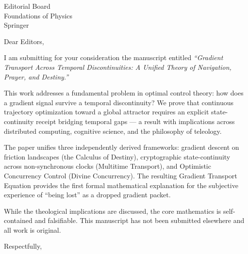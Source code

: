 \documentclass[11pt]{letter}
\begin{document}
\begin{letter}{Editorial Board \\ Foundations of Physics \\ Springer}

\opening{Dear Editors,}

I am submitting for your consideration the manuscript entitled \emph{``Gradient Transport Across Temporal Discontinuities: A Unified Theory of Navigation, Prayer, and Destiny.''}

This work addresses a fundamental problem in optimal control theory: how does a gradient signal survive a temporal discontinuity? We prove that continuous trajectory optimization toward a global attractor requires an explicit state-continuity receipt bridging temporal gaps --- a result with implications across distributed computing, cognitive science, and the philosophy of teleology.

The paper unifies three independently derived frameworks: gradient descent on friction landscapes (the Calculus of Destiny), cryptographic state-continuity across non-synchronous clocks (Multitime Transport), and Optimistic Concurrency Control (Divine Concurrency). The resulting Gradient Transport Equation provides the first formal mathematical explanation for the subjective experience of ``being lost'' as a dropped gradient packet.

While the theological implications are discussed, the core mathematics is self-contained and falsifiable. This manuscript has not been submitted elsewhere and all work is original.

\closing{Respectfully,}

\end{letter}
\end{document}
